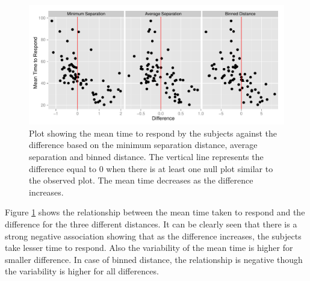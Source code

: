 \documentclass[12]{article}
\begin{document}
\begin{figure}[hbtp]
\centering
\includegraphics[scale=0.75]{largep-mtime-sep-bin.pdf}
	\vspace{-.1in}
\caption[Optional caption for list of figures]{Plot showing the mean time to respond by the subjects against the difference based on the minimum separation distance, average separation and binned distance. The vertical line represents the difference equal to 0 when there is at least one null plot similar to the observed plot. The mean time decreases as the difference increases.  }
\label{lp-mtime}
\end{figure}

Figure \ref{lp-mtime} shows the relationship between the mean time taken to respond and the difference for the three different distances. It can be clearly seen that there is a strong negative association showing that as the difference increases, the subjects take lesser time to respond. Also the variability of the mean time is higher for smaller difference. In case of binned distance, the relationship is negative though the variability is higher for all differences.
\end{document}
